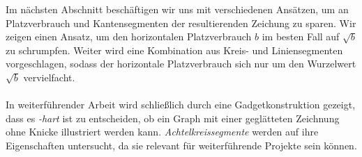 Im nächsten Abschnitt beschäftigen wir uns mit verschiedenen Ansätzen, um an Platzverbrauch und Kantensegmenten der resultierenden Zeichung zu sparen. Wir zeigen einen Ansatz, um den horizontalen Platzverbrauch $b$ im besten Fall auf $\sqrt{b}$ zu schrumpfen. Weiter wird eine Kombination aus Kreis- und Liniensegmenten vorgeschlagen, sodass der horizontale Platzverbrauch sich nur um den Wurzelwert $\sqrt{b}$ vervielfacht.
\\\\
In weiterführender Arbeit wird schließlich durch eine Gadgetkonstruktion gezeigt, dass es \textit{\NP-hart }ist zu entscheiden, ob ein Graph mit einer geglätteten Zeichnung ohne Knicke illustriert werden kann. \textit{Achtelkreissegmente} werden auf ihre Eigenschaften untersucht, da sie relevant für weiterführende Projekte sein können.

